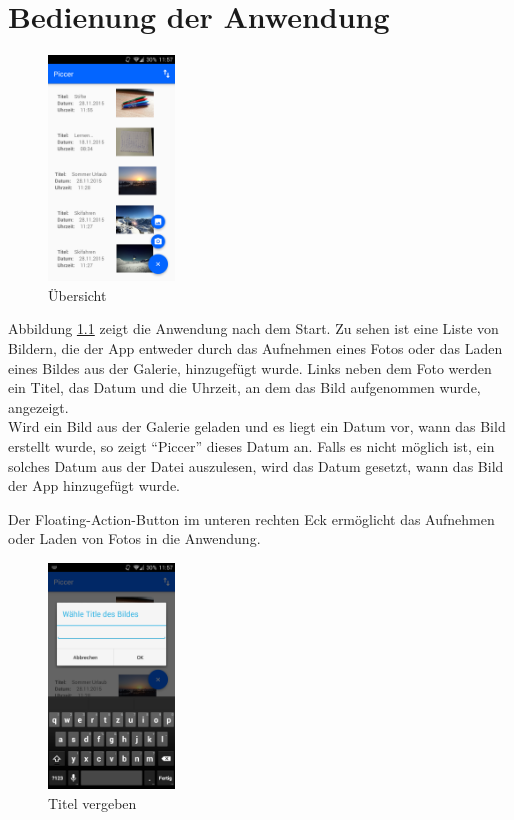 
\chapter{Bedienung der Anwendung}
\begin{figure}[H]
\centering
\includegraphics[width=0.3\textwidth]{images/bild_1}
\caption{Übersicht}
\label{Bild1}
\end{figure}
Abbildung \ref{Bild1} zeigt die Anwendung nach dem Start. Zu sehen ist eine Liste von Bildern, die der App entweder durch das Aufnehmen eines Fotos oder das Laden eines Bildes
aus der Galerie, hinzugefügt wurde. Links neben dem Foto werden ein Titel, das Datum und die Uhrzeit, an dem das Bild aufgenommen wurde, angezeigt. \\
Wird ein Bild aus der Galerie geladen und es liegt ein Datum vor, wann das Bild erstellt wurde, so zeigt \enquote{Piccer} dieses Datum an. Falls es nicht möglich ist, ein solches
Datum aus der Datei auszulesen, wird das Datum gesetzt, wann das Bild der App hinzugefügt wurde.

Der Floating-Action-Button im unteren rechten Eck ermöglicht das Aufnehmen oder Laden von Fotos in die Anwendung.

\begin{figure}[H]
\centering
\includegraphics[width=0.3\textwidth]{images/bild_2}
\caption{Titel vergeben}
\label{Bild2}
\end{figure}

